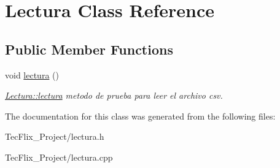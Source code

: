 \hypertarget{classLectura}{}\section{Lectura Class Reference}
\label{classLectura}
\subsection*{Public Member Functions}
\begin{DoxyCompactItemize}
\item 
\mbox{\label{classLectura_a3d71850a5edb46ba789cf0f555767444}} 
void \hyperlink{classLectura_a3d71850a5edb46ba789cf0f555767444}{lectura} ()
\begin{DoxyCompactList}\small\item\em \hyperlink{classLectura_a3d71850a5edb46ba789cf0f555767444}{Lectura\+::lectura} metodo de prueba para leer el archivo csv. \end{DoxyCompactList}\end{DoxyCompactItemize}


The documentation for this class was generated from the following files\+:\begin{DoxyCompactItemize}
\item 
Tec\+Flix\+\_\+\+Project/lectura.\+h\item 
Tec\+Flix\+\_\+\+Project/lectura.\+cpp\end{DoxyCompactItemize}
